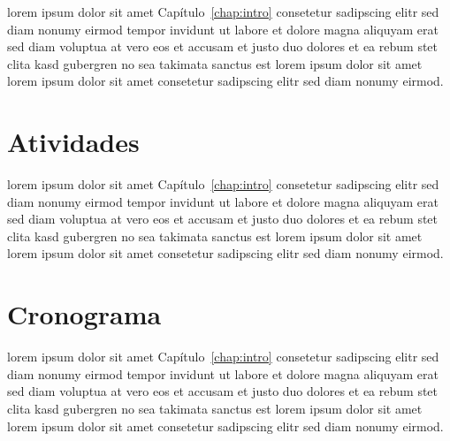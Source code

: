 lorem ipsum dolor sit amet Capítulo~\ref{chap:intro} consetetur
sadipscing elitr sed diam nonumy eirmod tempor invidunt ut labore
et dolore magna aliquyam erat sed diam voluptua at vero eos et
accusam et justo duo dolores et ea rebum stet clita kasd gubergren
no sea takimata sanctus est lorem ipsum dolor sit amet lorem ipsum
dolor sit amet consetetur sadipscing elitr sed diam nonumy eirmod.

\section{\label{sec:ativ}Atividades}

lorem ipsum dolor sit amet Capítulo~\ref{chap:intro} consetetur
sadipscing elitr sed diam nonumy eirmod tempor invidunt ut labore
et dolore magna aliquyam erat sed diam voluptua at vero eos et
accusam et justo duo dolores et ea rebum stet clita kasd gubergren
no sea takimata sanctus est lorem ipsum dolor sit amet lorem ipsum
dolor sit amet consetetur sadipscing elitr sed diam nonumy eirmod.

\section{\label{sec:crono}Cronograma}

lorem ipsum dolor sit amet Capítulo~\ref{chap:intro} consetetur
sadipscing elitr sed diam nonumy eirmod tempor invidunt ut labore
et dolore magna aliquyam erat sed diam voluptua at vero eos et
accusam et justo duo dolores et ea rebum stet clita kasd gubergren
no sea takimata sanctus est lorem ipsum dolor sit amet lorem ipsum
dolor sit amet consetetur sadipscing elitr sed diam nonumy eirmod.

